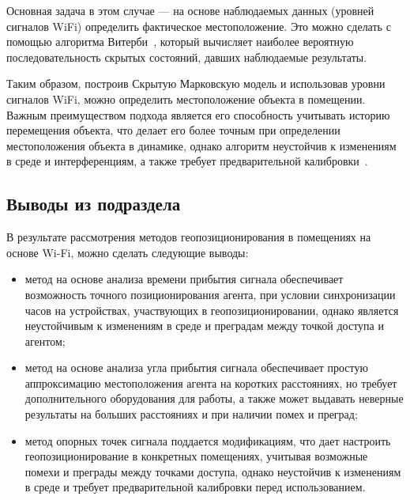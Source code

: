 Основная задача в этом случае --- на основе наблюдаемых данных (уровней сигналов WiFi) определить фактическое местоположение. Это можно сделать с помощью алгоритма Витерби~\cite{dong2020sequential}, который вычисляет наиболее вероятную последовательность скрытых состояний, давших наблюдаемые результаты.

Таким образом, построив Скрытую Марковскую модель и использовав уровни сигналов WiFi, можно определить местоположение объекта в помещении. Важным преимуществом подхода является его способность учитывать историю перемещения объекта, что делает его более точным при определении местоположения объекта в динамике, однако алгоритм неустойчив к изменениям в среде и интерференциям, а также требует предварительной калибровки~\cite{rudic2020geometry}.

\clearpage

\subsection*{Выводы из подраздела}

В результате рассмотрения методов геопозиционирования в помещениях на основе Wi-Fi, можно сделать следующие выводы:

\begin{itemize}[label=---]
    \item метод на основе анализа времени прибытия сигнала обеспечивает возможность точного позиционирования агента, при условии синхронизации часов на устройствах, участвующих в геопозиционировании, однако является неустойчивым к изменениям в среде и преградам между точкой доступа и агентом;
    \item метод на основе анализа угла прибытия сигнала обеспечивает простую аппроксимацию местоположения агента на коротких расстояниях, но требует дополнительного оборудования для работы, а также может выдавать неверные результаты на больших расстояниях и при наличии помех и преград;
    \item метод опорных точек сигнала поддается модификациям, что дает настроить геопозиционирование в конкретных помещениях, учитывая возможные помехи и преграды между точками доступа, однако неустойчив к изменениям в среде и требует предварительной калибровки перед использованием. 
\end{itemize}

\clearpage


